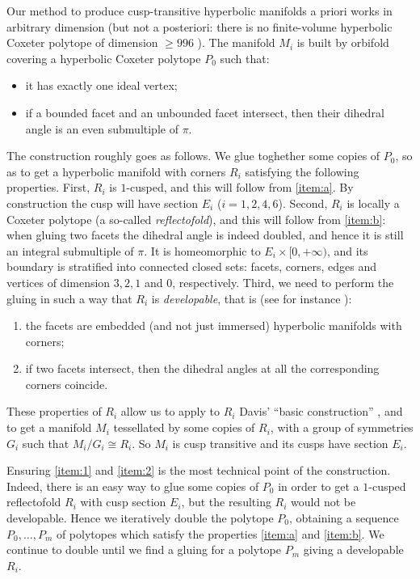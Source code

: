 \documentclass{amsart}
\makeatletter
\newcommand{\mylabel}[2]{#2\def\@currentlabel{#2}\label{#1}}
\theoremstyle{definition}
\theoremstyle{remark}
\makeatother
\begin{document}
Our method to produce cusp-transitive hyperbolic manifolds a priori works in arbitrary dimension (but not a posteriori: there is no finite-volume hyperbolic Coxeter polytope of dimension $\geq 996$ \cite{P}). The manifold $M_i$ is built by orbifold covering a hyperbolic Coxeter polytope $P_0$ such that:

\begin{itemize}
\item[\mylabel{item:a}{(a)}] it has exactly one ideal vertex;
\item[\mylabel{item:b}{(b)}] %
if a bounded facet and an unbounded facet intersect, then %
their dihedral angle is %
an even submultiple of $\pi$.
\end{itemize}

The construction roughly goes as follows. We glue toghether some copies of $P_0$, so as to get a hyperbolic manifold with corners $R_i$ satisfying the following properties. First, $R_i$ is $1$-cusped, and this will follow from \ref{item:a}. By construction the cusp will have section $E_i$ ($i=1,2,4,6$). Second, $R_i$ is locally a Coxeter polytope (a so-called \emph{reflectofold}), and this will follow from \ref{item:b}: when gluing two facets the dihedral angle is indeed doubled, and hence it is still an integral submultiple of $\pi$. It is homeomorphic to $E_i \times [0,+\infty)$, and its boundary is stratified into connected closed sets: facets, corners, edges and vertices of dimension $3, 2, 1$ and $0$, respectively. Third, we need to perform the gluing in such a way that $R_i$ is \emph{developable}, that is (see for instance \cite[Section 3]{CD}):
\begin{enumerate}
\item \label{item:1} the facets are embedded (and not just immersed) hyperbolic manifolds with corners;
\item \label{item:2} if two facets intersect, then the dihedral angles at all the corresponding corners coincide.
\end{enumerate}
These properties of $R_i$ allow us to apply to $R_i$ Davis' ``basic construction'' \cite{D}, and to get a manifold $M_i$ tessellated by some copies of $R_i$, with a group of symmetries $G_i$ such that $M_i/G_i \cong R_i$. So $M_i$ is cusp transitive and its cusps have section $E_i$.


Ensuring \eqref{item:1} and \eqref{item:2} is the most technical point of the construction. Indeed, there is an easy way to glue some copies of $P_0$ in order to get a $1$-cusped reflectofold $R_i$ with cusp section $E_i$, but the resulting $R_i$ would not be developable. Hence we iteratively double the polytope $P_0$, obtaining a sequence $P_0,\dots,P_m$ of polytopes which satisfy the properties \ref{item:a} and \ref{item:b}. We continue to double until we find a gluing for a polytope $P_m$ giving a developable $R_i$.
\end{document}
